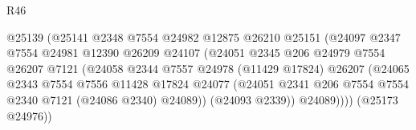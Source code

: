 \begin{lexlean}{R46}
\begin{coremodule}
                                          @25139
                                          (@25141
                                            @2348
                                            @7554
                                            @24982
                                            @12875
                                            @26210
                                            @25151
                                            (@24097
                                              @2347
                                              @7554
                                              @24981
                                              @12390
                                              @26209
                                              @24107
                                              (@24051
                                                @2345
                                                @206
                                                @24979
                                                @7554
                                                @26207
                                                @7121
                                                (@24058
                                                  @2344
                                                  @7557
                                                  @24978
                                                  (@11429 @17824)
                                                  @26207
                                                  (@24065
                                                    @2343
                                                    @7554
                                                    @7556
                                                    @11428
                                                    @17824
                                                    @24077
                                                    (@24051
                                                      @2341
                                                      @206
                                                      @7554
                                                      @7554
                                                      @2340
                                                      @7121
                                                      (@24086 @2340)
                                                      @24089))
                                                  (@24093 @2339))
                                                @24089))))
                                        (@25173 @24976))

\end{coremodule}
\end{lexlean}
